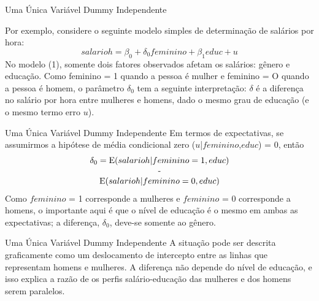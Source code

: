 \documentclass[t,14pt,mathserif]{beamer}
\begin{document}
\begin{frame}{Uma Única Variável Dummy Independente}
	   
		\begin{tcolorbox}
	Por exemplo, considere o seguinte modelo simples de determinação de salários por hora:
		\begin{equation}
		 { salarioh} =\beta_{0}+ \delta_{0} {feminino} + \beta_{1}  { educ }+u\label{23}
		\end{equation}
		No modelo (1), somente dois fatores observados afetam os salários: gênero e educação. Como feminino = 1 quando a pessoa é mulher e feminino = O quando a pessoa é homem, o parâmetro $\delta_{0}$ tem a seguinte interpretação: $ \delta $ é a diferença no salário por hora entre mulheres e homens, dado o mesmo grau de educação (e o mesmo termo erro $u$). 
			
		\end{tcolorbox}
	\end{frame}



\begin{frame}{Uma Única Variável Dummy Independente} 
        \vfill
		Em termos de expectativas, se assumirmos a hipótese de média condicional zero ($u$|$feminino$,$educ$) = 0, então 
         \begin{equation}
		\begin{array}{crl}
		 \delta_{0} = 
		\mathrm{E}(salarioh|feminino = 1, educ)
		 \\ \centerline{-} \\
		\mathrm{E}(salarioh|feminino = 0, educ)
		\end{array}\nonumber
		\end{equation} 
		    \justifying
        	Como {\small $feminino$ = 1} corresponde a mulheres e {\small $feminino$ = 0} corresponde a homens, o importante aqui é que o nível de educação é o mesmo em ambas as expectativas; a diferença, $\delta_{0}$, deve-se somente ao gênero.
		
\end{frame}

\begin{frame}{Uma Única Variável Dummy Independente}
		\justifying
		\vfill 
		A situação pode ser descrita graficamente como um deslocamento de intercepto entre as linhas que representam homens e mulheres.
		\vfill
		A diferença não depende do nível de educação, e isso explica a razão de os perfis salário-educação das mulheres e dos homens serem paralelos.
		\vfill
       
\end{frame}
\end{document}
